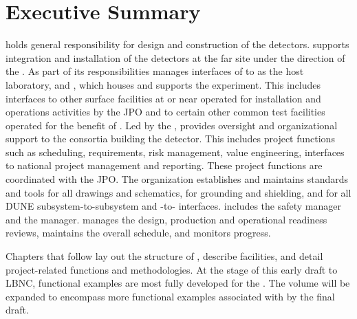 \chapter{Executive Summary}
\label{vl:tc-execsum}


  holds general responsibility for
design and construction of the  detectors.  supports
integration and installation of the detectors at the far site under the direction
of the .
As part of its responsibilities  manages interfaces of
 to \fnal as the host laboratory,  and
, which houses and supports the 
experiment. This includes interfaces to other surface facilities at or
near \surf operated for installation and operations activities by the JPO and to
certain other common test facilities operated for the benefit of
. Led by the  , 
 provides oversight and organizational support to the
consortia building the  detector.  This includes project
functions such as scheduling, requirements, risk management, value
engineering, interfaces to national project management and
reporting. These project functions are coordinated with the JPO.  The
 organization establishes and maintains standards and tools
for all drawings and schematics, for grounding and shielding, and for
all DUNE subsystem-to-subsystem and -to-
interfaces.   includes the  safety manager and
the   manager.   manages
the design, production and operational readiness reviews, maintains
the overall schedule, and monitors progress.

Chapters that follow lay out the structure of 
, describe  facilities, and detail
project-related functions and methodologies. At the stage of this
early draft to LBNC,   functional examples are most fully
developed for the  . The volume will be expanded to
encompass more functional examples associated with 
  by the final draft.

